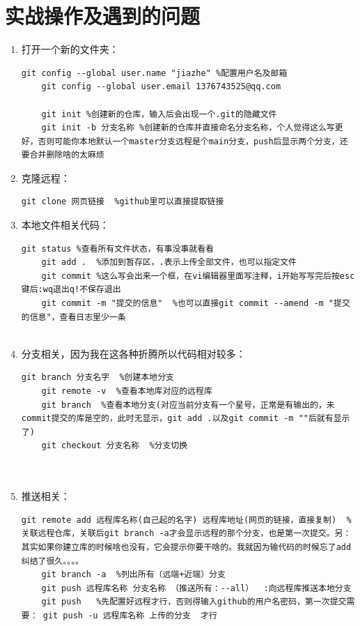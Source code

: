 \documentclass{article}
\begin{document}
\section{实战操作及遇到的问题}
\begin{enumerate}
\item 打开一个新的文件夹：
\begin{lstlisting}[breaklines=true]
	git config --global user.name "jiazhe" %配置用户名及邮箱
	git config --global user.email 1376743525@qq.com
	
	git init %创建新的仓库，输入后会出现一个.git的隐藏文件
	git init -b 分支名称 %创建新的仓库并直接命名分支名称，个人觉得这么写更好，否则可能你本地默认一个master分支远程是个main分支，push后显示两个分支，还要合并删除啥的太麻烦
\end{lstlisting}

\item 克隆远程：
\begin{lstlisting}[breaklines=true]
	git clone 网页链接  %github里可以直接提取链接
\end{lstlisting}	
	
\item 本地文件相关代码：
\begin{lstlisting}[breaklines=true]
	git status %查看所有文件状态，有事没事就看看
	git add .  %添加到暂存区，.表示上传全部文件，也可以指定文件
	git commit %这么写会出来一个框，在vi编辑器里面写注释，i开始写写完后按esc键后:wq退出q!不保存退出
	git commit -m "提交的信息"  %也可以直接git commit --amend -m "提交的信息"，查看日志里少一条
	
\end{lstlisting}	

\item 分支相关，因为我在这各种折腾所以代码相对较多：
\begin{lstlisting}[breaklines=true]
	git branch 分支名字  %创建本地分支
	git remote -v  %查看本地库对应的远程库
	git branch  %查看本地分支(对应当前分支有一个星号，正常是有输出的，未commit提交的库是空的，此时无显示，git add .以及git commit -m ""后就有显示了)
	git checkout 分支名称  %分支切换
	
				
\end{lstlisting}

\item 推送相关：
\begin{lstlisting}[breaklines=true]
	git remote add 远程库名称(自己起的名字) 远程库地址(网页的链接，直接复制)  %关联远程仓库，关联后git branch -a才会显示远程的那个分支，也是第一次提交。另：其实如果你建立库的时候啥也没有，它会提示你要干啥的。我就因为输代码的时候忘了add纠结了很久。。。。
	git branch -a  %列出所有（远端+近端）分支
	git push 远程库名称 分支名称 （推送所有：--all）  :向远程库推送本地分支
	git push   %先配置好远程才行，否则得输入github的用户名密码，第一次提交需要： git push -u 远程库名称 上传的分支  才行
\end{lstlisting}


\end{enumerate}
\end{document}

